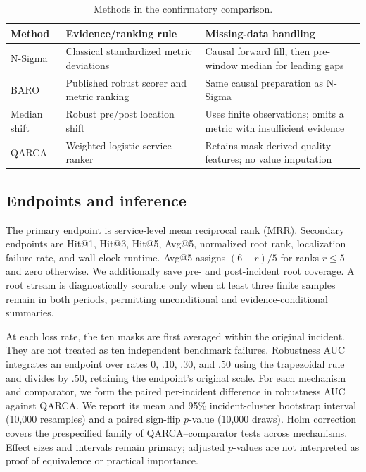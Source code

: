 \documentclass[runningheads]{llncs}
\begin{document}
\begin{table}[t]
\caption{Methods in the confirmatory comparison.}
\label{tab:methods}
\centering
\begin{tabular}{p{2.3cm}p{4.0cm}p{4.3cm}}
\toprule
Method & Evidence/ranking rule & Missing-data handling\\
\midrule
N-Sigma & Classical standardized metric deviations & Causal forward fill,
then pre-window median for leading gaps\\
BARO & Published robust scorer and metric ranking & Same causal preparation as
N-Sigma\\
Median shift & Robust pre/post location shift & Uses finite observations;
omits a metric with insufficient evidence\\
QARCA & Weighted logistic service ranker & Retains mask-derived quality
features; no value imputation\\
\bottomrule
\end{tabular}
\end{table}

\subsection{Endpoints and inference}

The primary endpoint is service-level mean reciprocal rank (MRR). Secondary
endpoints are Hit@1, Hit@3, Hit@5, Avg@5, normalized root rank, localization
failure rate, and wall-clock runtime. Avg@5 assigns $(6-r)/5$ for ranks
$r\leq5$ and zero otherwise. We additionally save pre- and post-incident root
coverage. A root stream is diagnostically scorable only when at least three
finite samples remain in both periods, permitting unconditional and
evidence-conditional summaries.

At each loss rate, the ten masks are first averaged within the original
incident. They are not treated as ten independent benchmark failures.
Robustness AUC integrates an endpoint over rates 0, .10, .30, and .50 using the
trapezoidal rule and divides by .50, retaining the endpoint's original scale.
For each mechanism and comparator, we form the paired per-incident difference
in robustness AUC against QARCA. We report its mean and 95\% incident-cluster
bootstrap interval (10,000 resamples) and a paired sign-flip $p$-value (10,000
draws). Holm correction \cite{holm1979} covers the prespecified family of
QARCA--comparator tests across mechanisms. Effect sizes and intervals remain
primary; adjusted $p$-values are not interpreted as proof of equivalence or
practical importance.
\end{document}
